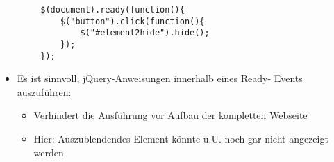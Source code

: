 \documentclass[10pt]{article}
\begin{document}
    \begin{tcolorbox}[
    colback=Red!5!white,
    colframe=Red!75!black,
    title={\centering Ready-Funktion}]
    \begin{lstlisting}
        $(document).ready(function(){
            $("button").click(function(){
                $("#element2hide").hide();
            });
        });
    \end{lstlisting}
    \begin{itemize}
        \item Es ist sinnvoll, jQuery-Anweisungen innerhalb eines Ready- Events auszuführen:
        \begin{itemize}
            \item Verhindert die Ausführung vor Aufbau der kompletten Webseite
            \item Hier: Auszublendendes Element könnte u.U. noch gar nicht angezeigt werden
        \end{itemize}
    \end{itemize}
    \end{tcolorbox}
\end{document}
